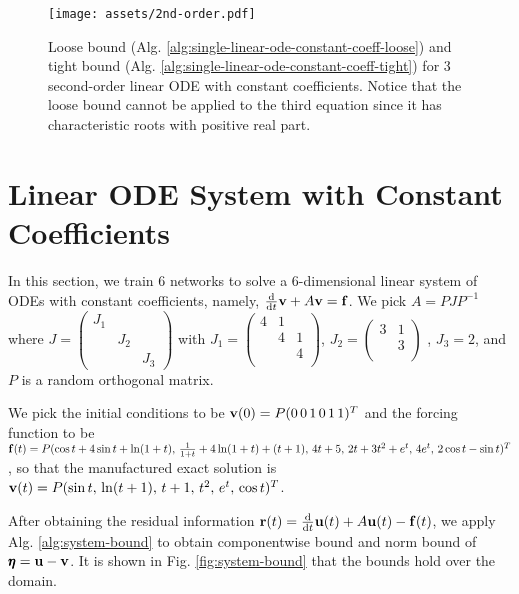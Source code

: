     \makeatletter
    \setlength{\@fptop}{0pt}
    \begin{figure}[!ht]
        \centering
        \texttt{[image: assets/2nd-order.pdf]}
        \caption{
            Loose bound (Alg. \ref{alg:single-linear-ode-constant-coeff-loose}) and tight bound (Alg. \ref{alg:single-linear-ode-constant-coeff-tight}) for 3 second-order linear ODE with constant coefficients.
            Notice that the loose bound cannot be applied to the third equation since it has characteristic roots with positive real part.
        }\label{fig:2nd-order-bound} 
    \end{figure}
    \makeatother

\section{Linear ODE System with Constant Coefficients} \label{section:high-dimension}
    In this section, we train $6$ networks to solve a $6$-dimensional linear system of ODEs with constant coefficients, namely, $\frac{\mathrm{d}}{\mathrm{d}t}\mathbf{v} + A\mathbf{v} = \mathbf{f}$. 
    We pick $A = PJP^{-1}$ where {$J=\begin{pmatrix}J_1\\[-1.25ex]&J_2\\[-1.25ex]&&J_3\end{pmatrix}$} with {$J_1 = \begin{pmatrix} 4&1\\[-1.25ex]&4&1\\[-1.25ex]&&4\\[-0.5ex]\end{pmatrix}$, $J_2 = \begin{pmatrix} 3&1\\[-1.25ex]&3\\[-0.25ex]\end{pmatrix}$ }, $J_3=2$, and $P$ is a random orthogonal matrix.

    We pick the initial conditions to be {$\mathbf{v}(0) = P(0\, 0\, 1\, 0\, 1\, 1)^{T}$} and the forcing function to be {$\mathbf{f}(t) = P(\cos t + 4 \sin t  + \ln(1+t),\, \frac{1}{1+t} + 4 \ln(1+t) + (t+1),\, 4t + 5,\, 2t + 3t^2 + e^t,\, 4 e^t,\, 2 \cos t - \sin t )^T$}, so that the manufactured exact solution is {$\mathbf{v}(t) = P ( \sin t,\, \ln(t + 1),\, t + 1,\, t^2,\, e^t,\, \cos t)^T$}.

    After obtaining the residual information {$\mathbf{r}(t)=\frac{\mathrm d}{\mathrm d t}\mathbf{u}(t) + A\mathbf{u}(t) - \mathbf{f}(t)$}, we apply Alg. \ref{alg:system-bound} to obtain componentwise bound and norm bound of {$\pmb{\eta} = \mathbf{u}-\mathbf{v}$}. 
    It is shown in Fig. \ref{fig:system-bound} that the bounds hold over the domain.

